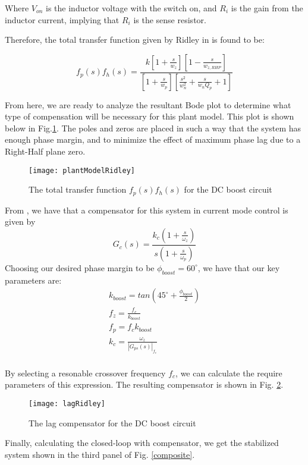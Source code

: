 Where $V_{on}$ is the inductor voltage with the switch on, and $R_i$ is the gain from the inductor current, implying that $R_i$ is the sense resistor.

Therefore, the total transfer function given by Ridley in \cite{ridley} is found to be:

\begin{equation}
\label{thirdOrder}
f_p(s)f_h(s)=\frac{k[1 + \frac{s}{w_z}][1 - \frac{s}{w_{z,RHP}}]}{[1 + \frac{s}{w_p}][\frac{s^2}{w_n^2} + \frac{s}{w_nQ_p} + 1]}
\end{equation}

From here, we are ready to analyze the resultant Bode plot to determine what type of compensation will be necessary for this plant model. This plot is shown below in Fig.\ref{plantModelRidley}.
The poles and zeros are placed in such a way that the system has enough phase margin, and to minimize the effect of maximum phase lag due to a Right-Half plane zero.

\begin{figure}[htbp]
\begin{center}
\texttt{[image: plantModelRidley]}
\caption{The total transfer function $f_p(s)f_h(s)$ for the DC boost circuit}
\label{plantModelRidley}
\end{center}
\end{figure}

From \cite{mohan}, we have that a compensator for this system in current mode control is given by
\begin{equation}
G_c(s) = \frac{k_c(1 + \frac{s}{\omega_z})}{s(1+\frac{s}{\omega_p})}
\end{equation}
Choosing our desired phase margin to be $\phi_{boost} = 60^{\circ}$, we have that our key parameters are:
\begin{gather*}
k_{boost} = tan(45^{\circ}+\frac{\phi_{boost}}{2})\\
f_z = \frac{f_c}{k_{boost}}\\
f_p = f_ck_{boost}\\
k_{c} = \frac{\omega_z}{|G_{ps}(s)|_{f_c}}\\
\end{gather*}

By selecting a resonable crossover frequency $f_c$, we can calculate the require parameters of this expression. The resulting compensator is shown in Fig. \ref{lagRidley}.
\begin{figure}[htbp]
\begin{center}
\texttt{[image: lagRidley]}
\caption{The lag compensator for the DC boost circuit}
\label{lagRidley}
\end{center}
\end{figure}
Finally, calculating the closed-loop with compensator, we get the stabilized system shown in the third panel of Fig. \ref{composite}. 

